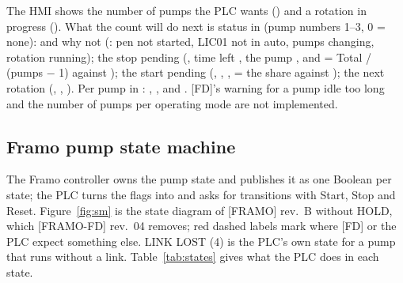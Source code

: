 \documentclass[11pt,a4paper]{article}
\begin{document}
The HMI shows the number of pumps the PLC wants () and a rotation
in progress (). What the count will do next is status in 
(pump numbers 1--3, 0 = none):  and why not (: pen not started, LIC01
not in auto, pumps changing, rotation running); the stop pending (, time left
, the pump , and  = Total / (pumps $-$ 1) against
); the start pending (, , ,
 = the share against ); the next rotation (,
, ). Per pump in : ,
,  and . [FD]'s warning for a pump idle too long and the number of pumps
per operating mode are not implemented.

\subsection{Framo pump state machine}
\label{sec:sm}
The Framo controller owns the pump state and publishes it as one Boolean per state; the PLC turns the
flags into  and asks for transitions with Start, Stop and Reset.
Figure~\ref{fig:sm} is the state diagram of [FRAMO] rev.~B without HOLD, which [FRAMO-FD] rev.~04
removes; red dashed labels mark where [FD] or the PLC expect something else. LINK LOST (4) is the PLC's own
state for a pump that runs without a link. Table~\ref{tab:states} gives what the PLC does in each state.
\end{document}
